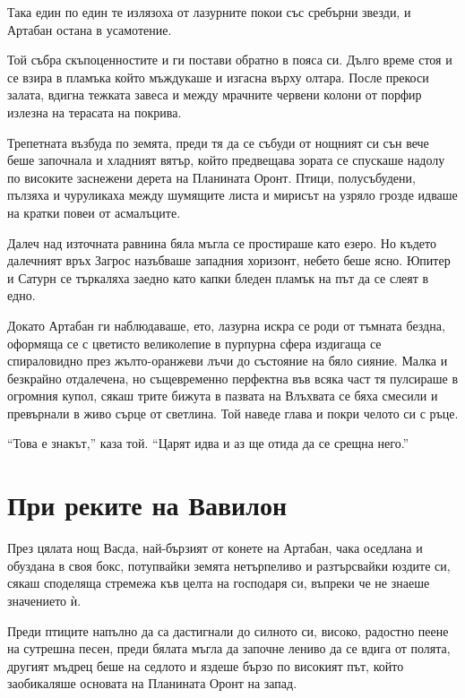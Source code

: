 \documentclass[oneside,10pt]{memoir}
\begin{document}
Така един по един те излязоха от лазурните покои със сребърни звезди, и
Артабан остана в усамотение.

Той събра скъпоценностите и ги постави обратно в пояса си. Дълго време стоя и се
взира в пламъка който мъждукаше и изгасна върху олтара. После прекоси залата,
вдигна тежката завеса и между мрачните червени колони от порфир излезна на
терасата на покрива.

Трепетната възбуда по земята, преди тя да се събуди от нощният си сън вече беше
започнала и хладният вятър, който предвещава зората се спускаше надолу по
високите заснежени дерета на Планината Оронт. Птици, полусъбудени, пълзяха и
чуруликаха между шумящите листа и мирисът на узряло грозде идваше на кратки
повеи от асмалъците.

Далеч над източната равнина бяла мъгла се простираше като езеро. Но където
далечният връх Загрос назъбваше западния хоризонт, небето беше ясно. Юпитер и
Сатурн се търкаляха заедно като капки бледен пламък на път да се слеят в едно.

Докато Артабан ги наблюдаваше, ето, лазурна искра се роди от тъмната бездна,
оформяща се с цветисто великолепие в пурпурна сфера издигаща се спираловидно
през жълто-оранжеви лъчи до състояние на бяло сияние. Малка и безкрайно
отдалечена, но същевременно перфектна във всяка част тя пулсираше в огромния
купол, сякаш трите бижута в пазвата на Влъхвата се бяха смесили и превърнали в
живо сърце от светлина. Той наведе глава и покри челото си с ръце.

``Това е знакът,'' каза той. ``Царят идва и аз ще отида да се срещна него.''

\part{При реките на Вавилон}

През цялата нощ Васда, най-бързият от конете на Артабан, чака оседлана и
обуздана в своя бокс, потупвайки земята нетърпеливо и разтърсвайки юздите си,
сякаш споделяща стремежа къв целта на господаря си, въпреки че не знаеше
значението ѝ.

Преди птиците напълно да са дастигнали до силното си, високо, радостно пеене на
сутрешна песен, преди бялата мъгла да започне лениво да се вдига от полята,
другият мъдрец беше на седлото и яздеше бързо по високият път, който заобикаляше
основата на Планината Оронт на запад.
\end{document}
